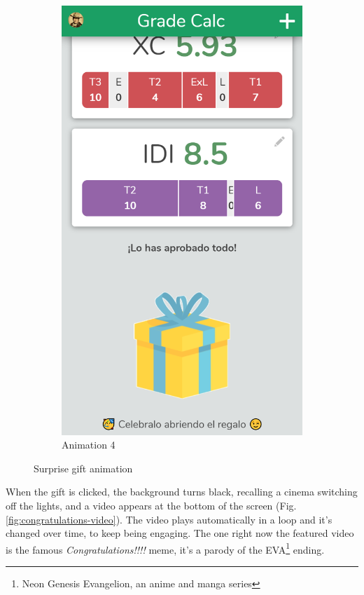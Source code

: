 \begin{figure}[htbp!]
\begin{subfigure}[b]{0.23\textwidth-0.1cm}
        \includegraphics[width=\textwidth]{media/screenshots/screenshot-gift.png}
        \caption{Animation 4}
    \end{subfigure}
    \caption{Surprise gift animation}
    \label{fig:gift-animation}
\end{figure}
\vfill

\clearpage\newpage

When the gift is clicked, the background turns black, recalling a cinema switching off the lights, and a video appears at the bottom of the screen (Fig. \ref{fig:congratulations-video}). The video plays automatically in a loop and it's changed over time, to keep being engaging. The one right now the featured video is the famous \textit{Congratulations!!!!} meme\cite{congratulations}, it's a parody of the EVA\footnote{Neon Genesis Evangelion, an anime and manga series } ending\cite{congratulations-parody}.

